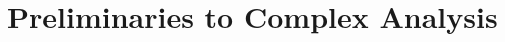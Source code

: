 \documentclass[../../main.tex]{subfiles}
\begin{document}
\chapter{Preliminaries to Complex Analysis}
\end{document}
